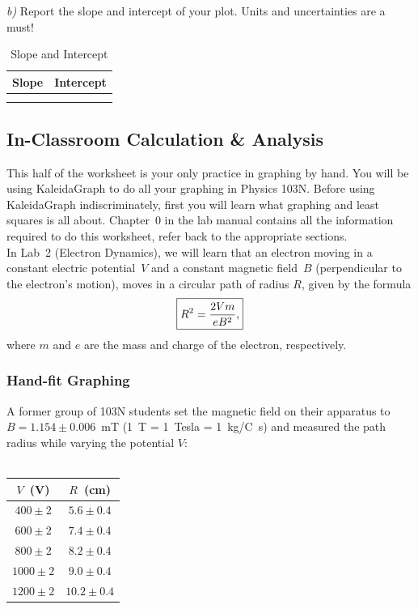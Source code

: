 {\it b)} Report the slope and intercept of your plot.
Units and uncertainties are a must! \\
\begin{table}[htb]
\begin{center}
\begin{tabular}{|c|c|}
\hline
Slope & Intercept \\
\hline
\hspace*{5cm} & \hspace*{5cm} \\
& \\
\hline
\end{tabular}
\end{center}
\caption{Slope and Intercept }
\end{table}

\subsection{In-Classroom Calculation \& Analysis}

\noindent This half of the worksheet is your only
practice in graphing by hand.  You will be using KaleidaGraph
to do all your graphing in Physics 103N.  Before using KaleidaGraph 
indiscriminately, first you will learn what graphing and least squares 
is all about.  Chapter~0 in the lab manual contains all the information
required to do this worksheet, refer back to the appropriate sections. \\

\noindent In Lab~2 (Electron Dynamics), we will learn that an electron 
moving in a 
constant electric potential~$V$ and a constant magnetic field~$B$ 
(perpendicular to the electron's motion), moves in a circular path of radius 
$R$, given by the formula
\begin{equation}
\fbox{$ \displaystyle R^2=\frac{2Vm}{eB^2}, $} \label{eq:1st:elect}
\end{equation}
where $m$ and $e$ are the mass and charge of the electron, respectively.\\

\subsubsection{Hand-fit Graphing}
\noindent A former group of 103N students set the magnetic field 
on their apparatus to
$B=1.154\pm 0.006$~mT (1~T = 1~Tesla = 1~kg/C~s) and measured the path radius
while varying the potential $V$:\\
\ \\
\begin{center}
\begin{tabular}{|c|c|}
\hline
$V$~(V) & $R$~(cm) \\
\hline
$400\pm 2$ & $5.6\pm 0.4$ \\
$600\pm 2$ & $7.4\pm 0.4$ \\
$800\pm 2$ & $8.2\pm 0.4$ \\
$1000\pm 2$ & $9.0\pm 0.4$ \\
$1200\pm 2$ & $10.2\pm 0.4$ \\
\hline
\end{tabular}  
\end{center}

